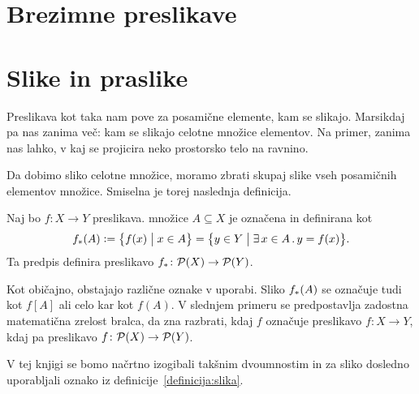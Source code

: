 


\section{Brezimne preslikave}\label{razdelek:brezimne-preslikave}



\section{Slike in praslike}

Preslikava kot taka nam pove za posamične elemente, kam se slikajo. Marsikdaj pa nas zanima več: kam se slikajo celotne množice elementov. Na primer, zanima nas lahko, v kaj se projicira neko prostorsko telo na ravnino.


Da dobimo sliko celotne množice, moramo zbrati skupaj slike vseh posamičnih elementov množice. Smiselna je torej naslednja definicija.

\begin{definicija}\label{definicija:slika}
Naj bo $f\colon X \to Y$ preslikava.  množice $A \subseteq X$ je označena in definirana kot
\[\img{f}{A} \dfeq \set[1]{f(x)}{x \in A} = \set[1]{y \in Y}{\xsome{x}[A]{y = f(x)}}.\]
Ta predpis definira preslikavo $\img{f}\colon \pst(X) \to \pst(Y)$.
\end{definicija}

\begin{opomba}
Kot običajno, obstajajo različne oznake v uporabi. Sliko $\img{f}{A}$ se označuje tudi kot $f[A]$ ali celo kar kot $f(A)$. V slednjem primeru se predpostavlja zadostna matematična zrelost bralca, da zna razbrati, kdaj $f$ označuje preslikavo $f\colon X \to Y$, kdaj pa preslikavo $f\colon \mathcal{P}(X) \to \mathcal{P}(Y)$.

V tej knjigi se bomo načrtno izogibali takšnim dvoumnostim in za sliko dosledno uporabljali oznako iz definicije~\ref{definicija:slika}.
\end{opomba}

